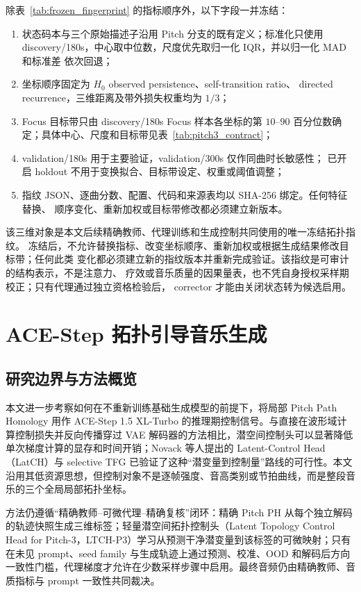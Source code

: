 \documentclass{article}
\begin{document}
除表~\ref{tab:frozen_fingerprint} 的指标顺序外，以下字段一并冻结：
\begin{enumerate}
  \item 状态码本与三个原始描述子沿用 Pitch 分支的既有定义；标准化只使用
  discovery/180s，中心取中位数，尺度优先取归一化 IQR，并以归一化 MAD 和标准差
  依次回退；
  \item 坐标顺序固定为 $H_0$ observed persistence、self-transition ratio、
  directed recurrence，三维距离及带外损失权重均为 $1/3$；
  \item Focus 目标带只由 discovery/180s Focus 样本各坐标的第 $10$--$90$
  百分位数确定；具体中心、尺度和目标带见表~\ref{tab:pitch3_contract}；
  \item validation/180s 用于主要验证，validation/300s 仅作同曲时长敏感性；
  已开启 holdout 不用于变换拟合、目标带设定、权重或阈值调整；
  \item 指纹 JSON、逐曲分数、配置、代码和来源表均以 SHA-256 绑定。任何特征替换、
  顺序变化、重新加权或目标带修改都必须建立新版本。
\end{enumerate}

该三维对象是本文后续精确教师、代理训练和生成控制共同使用的唯一冻结拓扑指纹。
冻结后，不允许替换指标、改变坐标顺序、重新加权或根据生成结果修改目标带；任何此类
变化都必须建立新的指纹版本并重新完成验证。该指纹是可审计的结构表示，不是注意力、
疗效或音乐质量的因果量表，也不凭自身授权采样期校正；只有代理通过独立资格检验后，
corrector 才能由关闭状态转为候选启用。

\section{ACE-Step 拓扑引导音乐生成}

\subsection{研究边界与方法概览}

本文进一步考察如何在不重新训练基础生成模型的前提下，将局部 Pitch Path Homology 用作 ACE-Step 1.5 XL-Turbo 的推理期控制信号\cite{gong2026}。与直接在波形域计算控制损失并反向传播穿过 VAE 解码器的方法相比，潜空间控制头可以显著降低单次梯度计算的显存和时间开销；Novack 等人提出的 Latent-Control Head（LatCH）与 selective TFG 已验证了这种``潜变量到控制量''路线的可行性\cite{novack2026}。本文沿用其低资源思想，但控制对象不是逐帧强度、音高类别或节拍曲线，而是整段音乐的三个全局局部拓扑坐标。

方法仍遵循``精确教师--可微代理--精确复核''闭环：精确 Pitch PH 从每个独立解码的轨迹快照生成三维标签；轻量潜空间拓扑控制头（Latent Topology Control Head for Pitch-3，LTCH-P3）学习从预测干净潜变量到该标签的可微映射；只有在未见 prompt、seed family 与生成轨迹上通过预测、校准、OOD 和解码后方向一致性门槛，代理梯度才允许在少数采样步骤中启用。最终音频仍由精确教师、音质指标与 prompt 一致性共同裁决。
\end{document}

